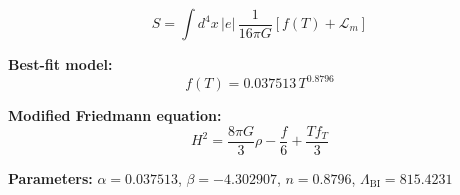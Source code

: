 
\begin{equation}
  S = \int d^4x \, |e| \, \frac{1}{16\pi G} \left[ f(T) + \mathcal{L}_m \right]
\end{equation}

\textbf{Best-fit model:}
\begin{equation}
  f(T) = 0.037513 \, T^{0.8796}
\end{equation}

\textbf{Modified Friedmann equation:}
\begin{equation}
  H^2 = \frac{8\pi G}{3} \rho - \frac{f}{6} + \frac{T f_T}{3}
\end{equation}

\textbf{Parameters:}
$\alpha = 0.037513$, \quad
$\beta = -4.302907$, \quad
$n = 0.8796$, \quad
$\Lambda_{\text{BI}} = 815.4231$